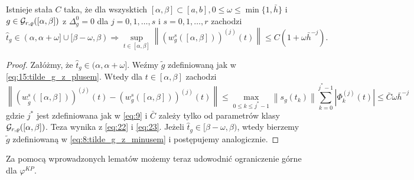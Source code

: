 \documentclass[oik, pdftex, man]{mgrwms}
\begin{document}
    \begin{lemma} \label{lem:3}
        Istnieje stała $C$ taka, że dla wszysktich $[\alpha, \beta] \subset [a, b], 0 \leq \omega \leq \min \{1, \bar{h}\}$ i $g \in \mathcal{G}_{r,\varrho}([\alpha,\beta])$ z $\Delta_{g}^{0}=0$ dla $j=0,1, \ldots, s$ i $s=0,1, \ldots, r$ zachodzi
        \begin{equation*}
            \hat{t}_{g} \in(\alpha, \alpha+\omega] \cup[\beta-\omega, \beta) \Rightarrow \sup _{t \in[\alpha, \beta]}\left\|\left(w_{g}^{s}([\alpha, \beta])\right)^{(j)}(t)\right\| \leq C\left(1+\omega \bar{h}^{-j}\right).
        \end{equation*}
    \end{lemma}
    \begin{proof}
        Załóżmy, że $\hat{t}_{g} \in (\alpha, \alpha+\omega]$. Weźmy $\tilde{g}$ zdefiniowaną jak w \eqref{eq:15:tilde_g_z_plusem}. Wtedy dla $t \in[\alpha, \beta]$ zachodzi
        \begin{equation} \label{eq:24}
            \left\|\left(w_{\tilde{g}}^{s}([\alpha, \beta])\right)^{(j)}(t)-\left(w_{g}^{s}([\alpha, \beta])\right)^{(j)}(t)\right\| \leq \max _{0 \leq k \leq j^{*}-1}\left\|s_{g}\left(t_{k}\right)\right\| \sum_{k=0}^{j^{*}-1}\left|\Phi_{k}^{(j)}(t)\right| \leq \bar{C} \omega \bar{h}^{-j}
        \end{equation}
        gdzie $j^{*}$ jest zdefiniowana jak w \eqref{eq:9} i $\bar{C}$  zależy tylko od parametrów klasy $\mathcal{G}_{r,\varrho}([\alpha,\beta])$. Teza wynika z \eqref{eq:22} i \eqref{eq:23}. Jeżeli $\hat{t}_{g} \in[\beta-\omega, \beta)$, wtedy bierzemy $\tilde{g}$ zdefiniowaną w \eqref{eq:8:tilde_g_z_minusem} i postępujemy analogicznie.
    \end{proof}

    Za pomocą wprowadzonych lematów możemy teraz udowodnić ograniczenie górne dla $\varphi^{KP}$.
\end{document}
